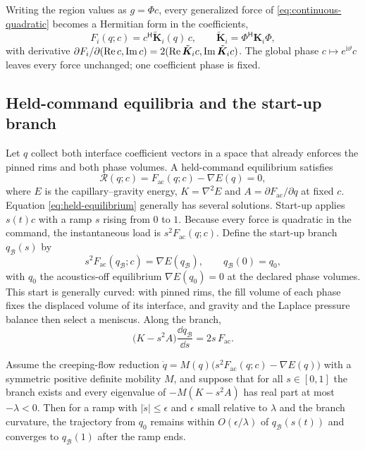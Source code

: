 Writing the region values as $g=\Phi c$, every generalized force of
\cref{eq:continuous-quadratic} becomes a Hermitian form in the coefficients,
\begin{equation}
 F_i(q;c)=c^{\mathsf H}\tilde{\bm K}_i(q)\,c,\qquad
 \tilde{\bm K}_i=\Phi^{\mathsf H}\bm K_i\Phi ,
 \label{eq:modal-force}
\end{equation}
with derivative $\partial F_i/\partial(\operatorname{Re} c,\operatorname{Im} c)=2(\operatorname{Re}\tilde{\bm K}_ic,
\operatorname{Im}\tilde{\bm K}_ic)$. The global phase $c\mapsto e^{\mathrm i\vartheta}c$
leaves every force unchanged; one coefficient phase is fixed.

\subsection{Held-command equilibria and the start-up branch}
Let $q$ collect both interface coefficient vectors in a space that already
enforces the pinned rims and both phase volumes. A held-command equilibrium
satisfies
\begin{equation}
 \mathcal R(q;c)=F_{\mathrm{ac}}(q;c)-\nabla E(q)=0,
 \label{eq:held-equilibrium}
\end{equation}
where $E$ is the capillary--gravity energy, $K=\nabla^2E$ and
$A=\partial F_{\mathrm{ac}}/\partial q$ at fixed $c$. Equation
\cref{eq:held-equilibrium} generally has several solutions. Start-up applies
$s(t)c$ with a ramp $s$ rising from $0$ to $1$. Because every force is
quadratic in the command, the instantaneous load is $s^2F_{\mathrm{ac}}(q;c)$.
Define the start-up branch $q_{\mathcal B}(s)$ by
\begin{equation}
 s^2F_{\mathrm{ac}}(q_{\mathcal B};c)=\nabla E(q_{\mathcal B}),\qquad
 q_{\mathcal B}(0)=q_0,
 \label{eq:startup-branch}
\end{equation}
with $q_0$ the acoustics-off equilibrium $\nabla E(q_0)=0$ at the declared
phase volumes. This start is generally curved: with pinned rims, the fill
volume of each phase fixes the displaced volume of its interface, and gravity
and the Laplace pressure balance then select a meniscus. Along the branch,
\begin{equation}
 \bigl(K-s^2A\bigr)\frac{\dd q_{\mathcal B}}{\dd s}=2s\,F_{\mathrm{ac}} .
 \label{eq:branch-tangent}
\end{equation}

\begin{proposition}\label{prop:adiabatic}
Assume the creeping-flow reduction $\dot q=M(q)\bigl(s^2F_{\mathrm{ac}}
(q;c)-\nabla E(q)\bigr)$ with a symmetric positive definite mobility $M$, and
suppose that for all $s\in[0,1]$ the branch exists and every eigenvalue of
$-M(K-s^2A)$ has real part at most $-\lambda<0$. Then for a ramp with
$\lvert\dot s\rvert\leq\epsilon$ and $\epsilon$ small relative to $\lambda$ and
the branch curvature, the trajectory from $q_0$ remains within
$O(\epsilon/\lambda)$ of $q_{\mathcal B}(s(t))$ and converges to
$q_{\mathcal B}(1)$ after the ramp ends.
\end{proposition}

